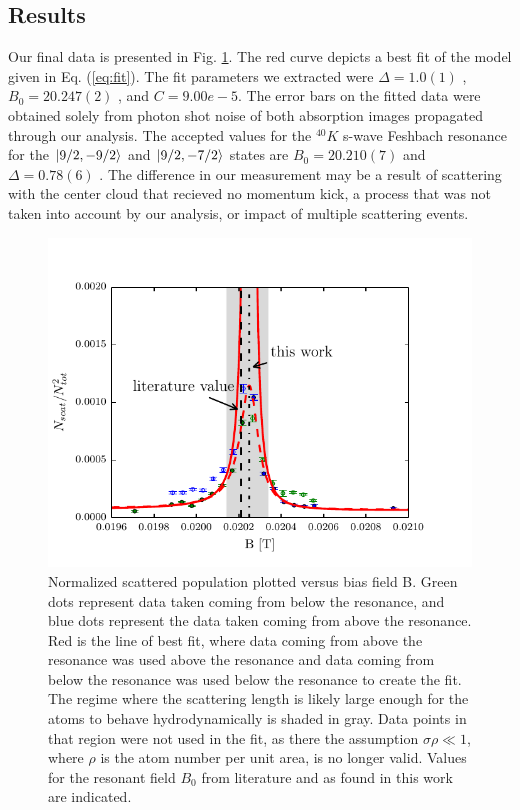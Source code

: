 \documentclass[12pt]{iopart}
\begin{document}
\subsection{Results}
Our final data is presented in Fig. \ref{fig:fittedFractions}. The red curve depicts a best fit of the model given in Eq. (\ref{eq:fit}). The fit parameters we extracted were $\Delta = 1.0(1)$  \mT{}, $B_0 = 20.247(2)$  \mT{}, and $C=9.00e-5$. The error bars on the fitted data were obtained solely from photon shot noise of both absorption images propagated through our analysis.
The accepted values for the $^{40}K$ s-wave Feshbach resonance for the  $\mathinner{|{9/2,-9/2}\rangle}$ and $\mathinner{|{9/2,-7/2}\rangle}$ states are $B_0=20.210(7)$  \mT{} and $\Delta=0.78(6)$  \mT{}. The difference in our measurement may be a result of scattering with the center cloud that recieved no momentum kick, a process that was not taken into account by our analysis, or impact of multiple scattering events. 
\begin{figure}
	\includegraphics{figure11.pdf}
\caption{Normalized scattered population plotted versus bias field B. Green dots represent data taken coming from below the resonance, and blue dots represent the data taken coming from above the resonance. Red is the line of best fit, where data coming from above the resonance was used above the resonance and data coming from below the resonance was used below the resonance to create the fit. The regime where the scattering length is likely large enough for the atoms to behave hydrodynamically is shaded in gray. Data points in that region were not used in the fit, as there the assumption $\sigma\rho\ll1$, where $\rho$ is the atom number per unit area, is no longer valid. Values for the resonant field $B_0$ from literature and as found in this work are indicated.    }  
\label{fig:fittedFractions}
\end{figure}
\end{document}
